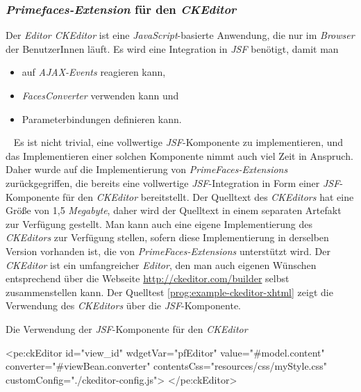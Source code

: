 \subsubsection{\emph{Primefaces-Extension} für den \emph{CKEditor}}
Der \emph{Editor CKEditor} ist eine \emph{JavaScript}-basierte Anwendung, die nur im \emph{Browser} der BenutzerInnen läuft. Es wird eine Integration in \emph{JSF} benötigt, damit man
\begin{itemize}
	\item auf \emph{AJAX-Events} reagieren kann,
	\item\emph{FacesConverter} verwenden kann und
	\item Parameterbindungen definieren kann.
\end{itemize}
\ \newline
Es ist nicht trivial, eine vollwertige \emph{JSF}-Komponente zu implementieren, und das Implementieren einer solchen Komponente nimmt auch viel Zeit in Anspruch. Daher wurde auf die Implementierung von \emph{PrimeFaces-Extensions} zurückgegriffen, die bereits eine vollwertige \emph{JSF}-Integration in Form einer \emph{JSF}-Komponente für den \emph{CKEditor} bereitstellt.
\newline
\newline
Der Quelltext des \emph{CKEditors} hat eine Größe von 1,5 \emph{Megabyte}, daher wird der Quelltext in einem separaten Artefakt zur Verfügung gestellt. Man kann auch eine eigene Implementierung des \emph{CKEditors} zur Verfügung stellen, sofern diese Implementierung in derselben Version vorhanden ist, die von \emph{PrimeFaces-Extensions} unterstützt wird. Der \emph{CKEditor} ist ein umfangreicher \emph{Editor}, den man auch eigenen Wünschen entsprechend über die Webseite \url{http://ckeditor.com/builder} selbst zusammenstellen kann.
\newline
\newline
Der Quelltest \ref{prog:example-ckeditor-xhtml} zeigt die Verwendung des \emph{CKEditors} über die \emph{JSF}-Komponente.
\begin{program}[h]
\caption{Die Verwendung der \emph{JSF}-Komponente für den \emph{CKEditor}}
\label{prog:example-ckeditor-xhtml}
\begin{HtmlCode}
<pe:ckEditor id="view_id"
             wdgetVar="pfEditor"
             value="#{model.content}"
             converter="#{viewBean.converter}" 
             contentsCss="resources/css/myStyle.css"
             customConfig="./ckeditor-config.js">
</pe:ckEditor>
\end{HtmlCode}
\end{program}
